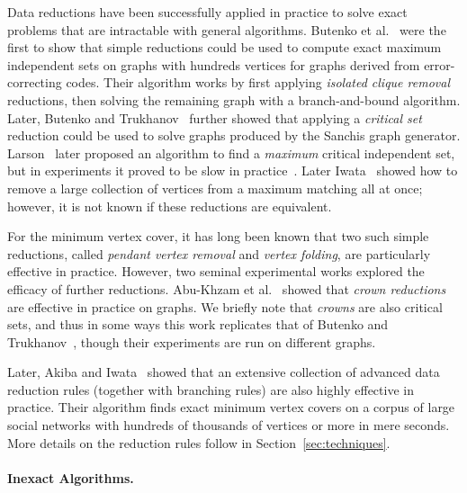 \documentclass[twoside,leqno,twocolumn]{article}
\begin{document}
Data reductions have been successfully applied in practice to solve exact problems that are intractable with general algorithms. Butenko et al.~\cite{butenko-2002} were the first to show that simple reductions could be used to compute exact maximum independent sets on graphs with hundreds vertices for graphs derived from error-correcting codes. Their algorithm works by first applying \emph{isolated clique removal} reductions, then solving the remaining graph with a branch-and-bound algorithm. Later, Butenko and Trukhanov~\cite{butenko-trukhanov} further showed that applying a \emph{critical set} reduction could be used to solve graphs produced by the Sanchis graph generator.
Larson~\cite{larson-2007} later proposed an algorithm to find a \emph{maximum} critical independent set, but in experiments it proved to be slow in practice~\cite{strash2016power}.
Later Iwata~\cite{iwata-2014} showed how to remove a large collection of vertices from a maximum matching all at once; however, it is not known if these reductions are equivalent.

For the minimum vertex cover, it has long been known that two such simple reductions, called \emph{pendant vertex removal} and \emph{vertex folding}, are particularly effective in practice. However, two seminal experimental works explored the efficacy of further reductions. Abu-Khzam et al.~\cite{abu-khzam-2007} showed that \emph{crown reductions} are effective in practice on  graphs. We briefly note that \emph{crowns} are also critical sets, and thus in some ways this work replicates that of Butenko and Trukhanov~\cite{butenko-trukhanov}, though their experiments are run on different graphs.



Later, Akiba and Iwata~\cite{akiba-tcs-2016} showed that an extensive collection of advanced data reduction rules (together with branching rules) are also highly effective in practice. Their algorithm finds exact minimum vertex covers on a corpus of large social networks with hundreds of thousands of vertices or more in mere seconds. More details on the reduction rules follow in Section~\ref{sec:techniques}.


\paragraph*{Inexact Algorithms.}
\end{document}
